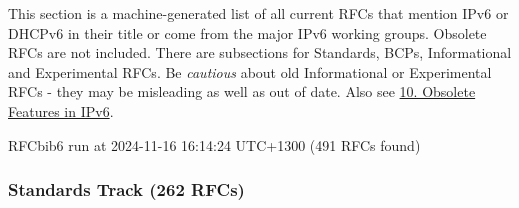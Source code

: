 \documentclass[
]{article}
\begin{document}
This section is a machine-generated list of all current RFCs that
mention IPv6 or DHCPv6 in their title or come from the major IPv6
working groups. Obsolete RFCs are not included. There are subsections
for Standards, BCPs, Informational and Experimental RFCs. Be
\emph{cautious} about old Informational or Experimental RFCs - they may
be misleading as well as out of date. Also see
\hyperref[obsolete-features-in-ipv6]{10. Obsolete Features in IPv6}.

RFCbib6 run at 2024-11-16 16:14:24 UTC+1300 (491 RFCs found)

\subsubsection{Standards Track (262
RFCs)}\label{standards-track-262-rfcs}
\end{document}
